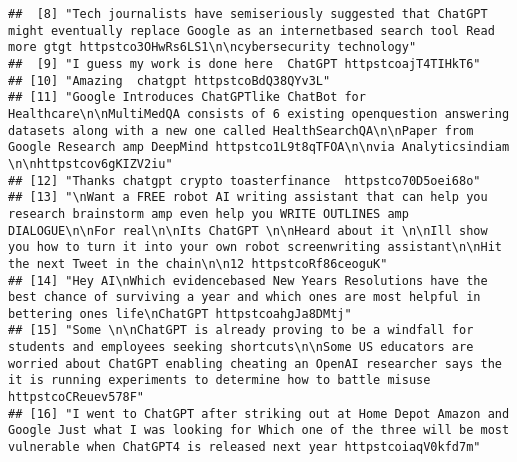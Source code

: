 \documentclass[
]{article}
\begin{document}
\begin{verbatim}
##  [8] "Tech journalists have semiseriously suggested that ChatGPT might eventually replace Google as an internetbased search tool Read more gtgt httpstco3OHwRs6LS1\n\ncybersecurity technology"                                                                                                                          
##  [9] "I guess my work is done here  ChatGPT httpstcoajT4TIHkT6"                                                                                                                                                                                                                                                          
## [10] "Amazing  chatgpt httpstcoBdQ38QYv3L"                                                                                                                                                                                                                                                                               
## [11] "Google Introduces ChatGPTlike ChatBot for Healthcare\n\nMultiMedQA consists of 6 existing openquestion answering datasets along with a new one called HealthSearchQA\n\nPaper from Google Research amp DeepMind httpstco1L9t8qTFOA\n\nvia Analyticsindiam \n\nhttpstcov6gKIZV2iu"                                  
## [12] "Thanks chatgpt crypto toasterfinance  httpstco70D5oei68o"                                                                                                                                                                                                                                                          
## [13] "\nWant a FREE robot AI writing assistant that can help you research brainstorm amp even help you WRITE OUTLINES amp DIALOGUE\n\nFor real\n\nIts ChatGPT \n\nHeard about it \n\nIll show you how to turn it into your own robot screenwriting assistant\n\nHit the next Tweet in the chain\n\n12 httpstcoRf86ceoguK"
## [14] "Hey AI\nWhich evidencebased New Years Resolutions have the best chance of surviving a year and which ones are most helpful in bettering ones life\nChatGPT httpstcoahgJa8DMtj"                                                                                                                                     
## [15] "Some \n\nChatGPT is already proving to be a windfall for students and employees seeking shortcuts\n\nSome US educators are worried about ChatGPT enabling cheating an OpenAI researcher says the it is running experiments to determine how to battle misuse httpstcoCReuev578F"                                   
## [16] "I went to ChatGPT after striking out at Home Depot Amazon and Google Just what I was looking for Which one of the three will be most vulnerable when ChatGPT4 is released next year httpstcoiaqV0kfd7m"                                                                                                            

\end{verbatim}
\end{document}
